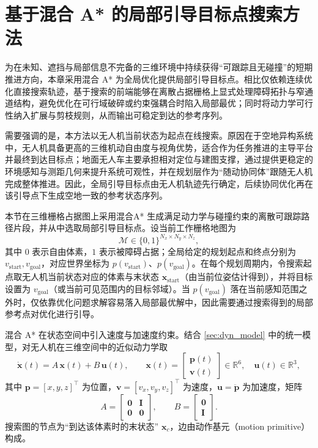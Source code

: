 \section{基于混合 A* 的局部引导目标点搜索方法} \label{sec:astar_search}

为在未知、遮挡与局部信息不完备的三维环境中持续获得“可跟踪且无碰撞”的短期推进方向，本章采用混合 A* 为全局优化提供局部引导目标点。相比仅依赖连续优化直接搜索轨迹，基于搜索的前端能够在离散占据栅格上显式处理障碍拓扑与窄通道结构，避免优化在可行域破碎或约束强耦合时陷入局部最优；同时将动力学可行性纳入扩展与剪枝规则，从而输出可稳定到达的参考序列。

需要强调的是，本方法以无人机当前状态为起点在线搜索。原因在于空地异构系统中，无人机具备更高的三维机动自由度与视角优势，适合作为任务推进的主导平台并最终到达目标点；地面无人车主要承担相对定位与建图支撑，通过提供更稳定的环境感知与测距几何来提升系统可观性，并在规划层作为“随动协同体”跟随无人机完成整体推进。因此，全局引导目标点由无人机轨迹先行确定，后续协同优化再在该引导点下生成空地一致的参考状态序列。

本节在三维栅格占据图上采用混合A* 生成满足动力学与碰撞约束的离散可跟踪路径片段，并从中选取局部引导目标点。设当前工作栅格地图为
\[
\mathcal{M}\in\{0,1\}^{N_x\times N_y\times N_z},
\]
其中 \(0\) 表示自由体素，\(1\) 表示被障碍占据；全局给定的规划起点和终点分别为 \(v_{\mathrm{start}},v_{\mathrm{goal}}\)，对应世界坐标为 \(p(v_{\mathrm{start}})\)、\(p(v_{\mathrm{goal}})\)。在每个规划周期内，令搜索起点取无人机当前状态对应的体素与末状态 \(\mathbf{x}_{\mathrm{start}}\)（由当前位姿估计得到），并将目标设置为 \(v_{\mathrm{goal}}\)（或当前可见范围内的目标邻域）。当 \(p(v_{\mathrm{goal}})\) 落在当前感知范围之外时，仅依靠优化问题求解容易落入局部最优解中，因此需要通过搜索得到的局部参考点对优化进行引导。

混合 A* 在状态空间中引入速度与加速度约束。结合 \autoref{sec:dyn_model} 中的统一模型，对无人机在三维空间中的近似动力学取
\begin{equation}
\dot{\mathbf{x}}(t)=A\,\mathbf{x}(t)+B\,\mathbf{u}(t),\qquad
\mathbf{x}(t)=\begin{bmatrix}\mathbf{p}(t)\\ \mathbf{v}(t)\end{bmatrix}\in\mathbb{R}^6,\quad
\mathbf{u}(t)\in\mathbb{R}^3,
\label{eq:kino_ct}
\end{equation}
其中 \(\mathbf{p}=[x,y,z]^\top\) 为位置，\(\mathbf{v}=[v_x,v_y,v_z]^\top\) 为速度，\(\mathbf{u}=\ddot{\mathbf{p}}\) 为加速度，矩阵
\[
A=\begin{bmatrix}\mathbf{0}&\mathbf{I}\\ \mathbf{0}&\mathbf{0}\end{bmatrix},\qquad
B=\begin{bmatrix}\mathbf{0}\\ \mathbf{I}\end{bmatrix}.
\]
搜索图的节点为“到达该体素时的末状态” \(\mathbf{x}_c\)，边由动作基元（motion primitive）构成。

